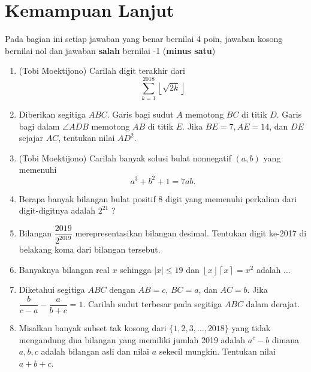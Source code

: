 \documentclass[12pt]{scrartcl}
\begin{document}
\section{Kemampuan Lanjut}
Pada bagian ini setiap jawaban yang benar bernilai 4 poin, jawaban kosong bernilai nol
dan jawaban \textbf{salah} bernilai -1 (\textbf{minus satu})

\begin{enumerate}[resume]
	\item (Tobi Moektijono)
	Carilah digit terakhir dari $$\sum_{k=1}^{2018} \left \lfloor \sqrt{2k} \right \rfloor $$
	
	\item Diberikan segitiga $ABC$. Garis bagi sudut $A$ memotong $BC$ di titik $D$. Garis bagi
	dalam $\angle ADB$ memotong $AB$ di titik $E$. Jika $BE = 7, AE = 14$, dan $DE$ sejajar $AC$,
	tentukan nilai $AD^2$.
	
	\item (Tobi Moektijono)
	Carilah banyak solusi bulat nonnegatif $(a,b)$ yang memenuhi $$a^3+b^2+1=7ab.$$
	
	\item
	Berapa banyak bilangan bulat positif 8 digit yang memenuhi perkalian dari digit-digitnya adalah $2^{21}$
	?
	
	\item Bilangan $\dfrac{2019}{2^{2019}}$ merepresentasikan bilangan desimal. Tentukan digit ke-2017 di belakang koma dari bilangan tersebut.
	
	\item Banyaknya bilangan real $x$ sehingga $|x| \le 19$ dan $\left \lfloor x \right \rfloor\left \lceil x \right \rceil = x^2$ adalah $\dots$
	
	\item Diketahui segitiga $ABC$ dengan $AB=c$, $BC=a$, dan $AC=b$. Jika $\dfrac{b}{c-a} - \dfrac{a}{b+c} = 1$. Carilah sudut terbesar pada segitiga $ABC$ dalam derajat.
	
	\item
	Misalkan banyak subset tak kosong dari $\{1,2,3,\dots,2018\}$ yang tidak mengandung dua bilangan yang memiliki jumlah 2019 adalah $a^c-b$ dimana $a,b,c$ adalah bilangan asli dan nilai $a$ sekecil mungkin. Tentukan nilai $a+b+c$.

\end{enumerate}
	
	
	
\end{document}
